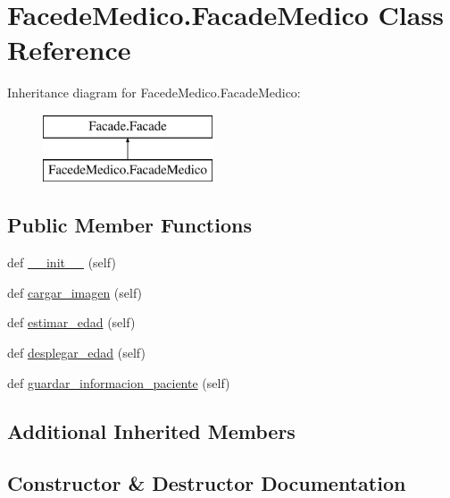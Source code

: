 \hypertarget{class_facede_medico_1_1_facade_medico}{}\section{Facede\+Medico.\+Facade\+Medico Class Reference}
\label{class_facede_medico_1_1_facade_medico}
Inheritance diagram for Facede\+Medico.\+Facade\+Medico\+:\begin{figure}[H]
\begin{center}
\leavevmode
\includegraphics[height=2.000000cm]{class_facede_medico_1_1_facade_medico}
\end{center}
\end{figure}
\subsection*{Public Member Functions}
\begin{DoxyCompactItemize}
\item 
def \mbox{\hyperlink{class_facede_medico_1_1_facade_medico_a461dbe3bea34efedec3c2425e48982da}{\+\_\+\+\_\+init\+\_\+\+\_\+}} (self)
\item 
def \mbox{\hyperlink{class_facede_medico_1_1_facade_medico_a2d0ba068aaf9eaa04d9b297ed947e9c7}{cargar\+\_\+imagen}} (self)
\item 
def \mbox{\hyperlink{class_facede_medico_1_1_facade_medico_a23738769ea9bd5016e9bc191c83a3fed}{estimar\+\_\+edad}} (self)
\item 
def \mbox{\hyperlink{class_facede_medico_1_1_facade_medico_a865f5e402914ba2461306bed197fc3c7}{desplegar\+\_\+edad}} (self)
\item 
def \mbox{\hyperlink{class_facede_medico_1_1_facade_medico_a4acf15afa074658561ab423294821c74}{guardar\+\_\+informacion\+\_\+paciente}} (self)
\end{DoxyCompactItemize}
\subsection*{Additional Inherited Members}


\subsection{Constructor \& Destructor Documentation}
\mbox{\label{class_facede_medico_1_1_facade_medico_a461dbe3bea34efedec3c2425e48982da}} 
